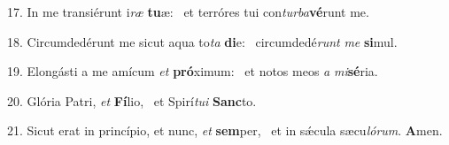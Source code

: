 17. In me transiérunt i\textit{ræ} \textbf{tu}æ: \ast\  et terróres tui con\textit{tur}\textit{ba}\textbf{vé}runt me.\

18. Circumdedérunt me sicut aqua to\textit{ta} \textbf{di}e: \ast\  circumdedé\textit{runt} \textit{me} \textbf{si}mul.\

19. Elongásti a me amícum \textit{et} \textbf{pró}ximum: \ast\  et notos meos \textit{a} \textit{mi}\textbf{sé}ria.\

20. Glória Patri, \textit{et} \textbf{Fí}lio, \ast\  et Spirí\textit{tu}\textit{i} \textbf{Sanc}to.\

21. Sicut erat in princípio, et nunc, \textit{et} \textbf{sem}per, \ast\  et in sǽcula sæcu\textit{ló}\textit{rum}. \textbf{A}men.\

